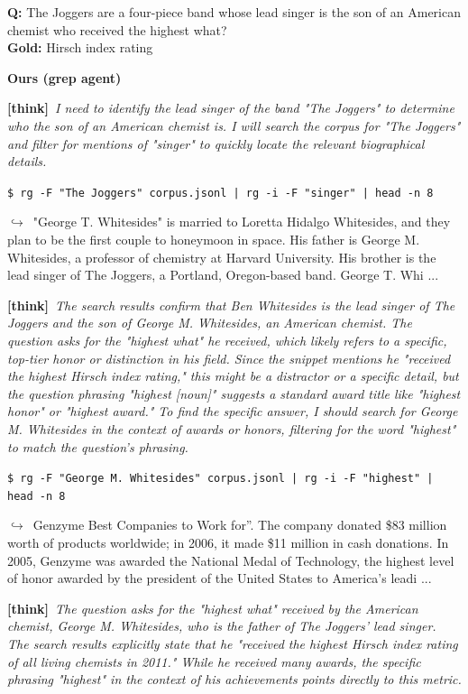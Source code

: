 \documentclass{article} %
\newcommand{\cmark}{\textcolor{green!45!black}{\ding{51}}}
\newcommand{\winbadge}{\colorbox{green!50!black}{\textcolor{white}{\scriptsize\bfseries\,WIN\,}}}
\newcommand{\thk}[1]{{\footnotesize\textcolor{violet!75!black}{\textbf{[think]}}\ \textit{#1}\par}}
\newcommand{\cmd}[1]{{\footnotesize\texttt{\textcolor{blue!35!black}{\$\ #1}}\par}}
\newcommand{\retr}[1]{{\footnotesize\textcolor{black!65}{\quad$\hookrightarrow$\ #1}\par}}
\begin{document}
\begin{cmpbox}[label={ex:hotpot-joggers},title={\winbadge\ \ \textsc{HotpotQA -- multi-hop bridge + distinctive phrase}}]
\textbf{Q:} The Joggers are a four-piece band whose lead singer is the son of an American chemist who received the highest what?\\[1pt]
\textbf{Gold:} Hirsch index rating\par\smallskip
\textbf{Ours (grep agent)}~\cmark\par
  \thk{I need to identify the lead singer of the band "The Joggers" to determine who the son of an American chemist is. I will search the corpus for "The Joggers" and filter for mentions of "singer" to quickly locate the relevant biographical details.}
  \cmd{rg -F "The Joggers" corpus.jsonl | rg -i -F "singer" | head -n 8}
  \retr{"George T. Whitesides" is married to Loretta Hidalgo Whitesides, and they plan to be the first couple to honeymoon in space. His father is George M. Whitesides, a professor of chemistry at Harvard University. His brother is the lead singer of The Joggers, a Portland, Oregon-based band. George T. Whi ...}
  \thk{The search results confirm that Ben Whitesides is the lead singer of The Joggers and the son of George M. Whitesides, an American chemist. The question asks for the "highest what" he received, which likely refers to a specific, top-tier honor or distinction in his field. Since the snippet mentions he "received the highest Hirsch index rating," this might be a distractor or a specific detail, but the question phrasing "highest [noun]" suggests a standard award title like "highest honor" or "highest award." To find the specific answer, I should search for George M. Whitesides in the context of awards or honors, filtering for the word "highest" to match the question's phrasing.}
  \cmd{rg -F "George M. Whitesides" corpus.jsonl | rg -i -F "highest" | head -n 8}
  \retr{Genzyme Best Companies to Work for”. The company donated \$83 million worth of products worldwide; in 2006, it made \$11 million in cash donations. In 2005, Genzyme was awarded the National Medal of Technology, the highest level of honor awarded by the president of the United States to America’s leadi ...}
  \thk{The question asks for the "highest what" received by the American chemist, George M. Whitesides, who is the father of The Joggers' lead singer. The search results explicitly state that he "received the highest Hirsch index rating of all living chemists in 2011." While he received many awards, the specific phrasing "highest" in the context of his achievements points directly to this metric.}

\end{cmpbox}
\end{document}
